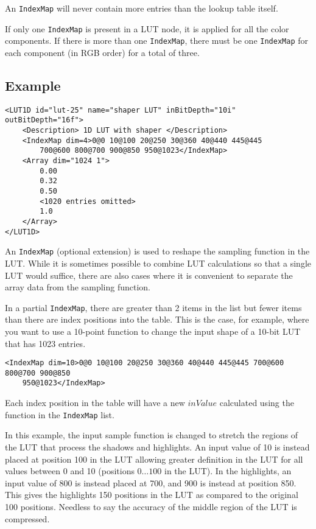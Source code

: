 An \texttt{IndexMap} will never contain more entries than the lookup table itself.

If only one \texttt{IndexMap} is present in a LUT node, it is applied for all the color components. If there is more than one \texttt{IndexMap}, there must be one \texttt{IndexMap} for each component (in RGB order) for a total of three.


\subsection*{Example}

\lstset{frame=single}
\begin{lstlisting}[caption=Example of a partially enumerated ``Shaper LUT'']
<LUT1D id="lut-25" name="shaper LUT" inBitDepth="10i" outBitDepth="16f">
	<Description> 1D LUT with shaper </Description>
	<IndexMap dim=4>0@0 10@100 20@250 30@360 40@440 445@445 
	    700@600 800@700 900@850 950@1023</IndexMap>
	<Array dim="1024 1">
        0.00
        0.32
        0.50
        <1020 entries omitted>
        1.0
	</Array>
</LUT1D>
\end{lstlisting}

An \texttt{IndexMap} (optional extension) is used to reshape the sampling function in the LUT.  While it is sometimes possible to combine LUT calculations so that a single LUT would suffice, there are also cases where it is convenient to separate the array data from the sampling function.

In a partial \texttt{IndexMap}, there are greater than 2 items in the list but fewer items than there are index positions into the table. This is the case, for example, where you want to use a 10-point function to change the input shape of a 10-bit LUT that has 1023 entries.

\lstset{frame=none}
\begin{lstlisting}
<IndexMap dim=10>0@0 10@100 20@250 30@360 40@440 445@445 700@600 800@700 900@850 
    950@1023</IndexMap>
\end{lstlisting}
\lstset{frame=single}

Each index position in the table will have a new $inValue$ calculated using the function in the \texttt{IndexMap} list.

In this example, the input sample function is changed to stretch the regions of the LUT that process the shadows and highlights. An input value of 10 is instead placed at position 100 in the LUT allowing greater definition in the LUT for all values between 0 and 10 (positions $0 \ldots 100$ in the LUT). In the highlights, an input value of 800 is instead placed at 700, and 900 is instead at position 850. This gives the highlights 150 positions in the LUT as compared to the original 100 positions. Needless to say the accuracy of the middle region of the LUT is compressed.

